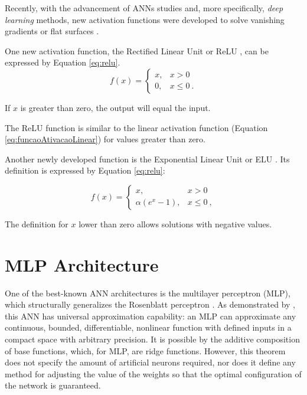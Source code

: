 Recently, with the advancement of ANNs studies and, more specifically, \textit{deep learning} methods, new activation functions were developed to solve vanishing gradients or flat surfaces \cite{Fahlman1988}.

One new activation function, the Rectified Linear Unit or ReLU \cite{Maas2013}, %
can be expressed by Equation \ref{eq:relu}.
\begin{equation}
	\label{eq:relu}
	f(x) = \left\{\begin{matrix}
		x, & x > 0    \\
		0, & x \leq 0 \:.
	\end{matrix}\right.
\end{equation}

\noindent
If $x$ is greater than zero, the output will equal the input.

The ReLU function is similar to the linear activation function (Equation \ref{eq:funcaoAtivacaoLinear}) for values greater than zero. %

Another newly developed function is the Exponential Linear Unit or ELU \cite{Clevert2016}. Its definition is expressed by Equation \ref{eq:relu}:

\begin{equation}
	\label{eq:elu}
	f(x) = \left\{\begin{matrix}
		x,               & x > 0    \\
		\alpha(e^x - 1), & x \leq 0 \:,
	\end{matrix}\right.
\end{equation}

The definition for $x$ lower than zero allows solutions with negative values.

\section{MLP Architecture}
\label{sec:mlp}

One of the best-known ANN architectures is the multilayer perceptron (MLP), which structurally generalizes the Rosenblatt perceptron \cite{Rosenblatt1958}. As demonstrated by \cite{Cybenko1989}, this ANN has universal approximation capability: an MLP can approximate any continuous, bounded, differentiable, nonlinear function with defined inputs in a compact space with arbitrary precision. It is possible by the additive composition of base functions, which, for MLP, are ridge functions. However, this theorem does not specify the amount of artificial neurons required, nor does it define any method for adjusting the value of the weights so that the optimal configuration of the network is guaranteed.

